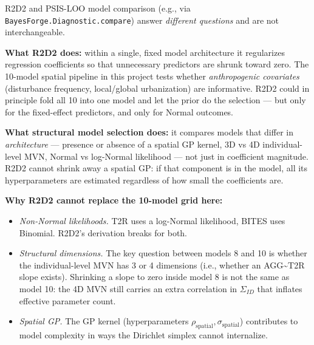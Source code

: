 \documentclass[
  letterpaper,
  DIV=11,
  numbers=noendperiod]{scrartcl}
\providecommand{\tightlist}{%
  \setlength{\itemsep}{0pt}\setlength{\parskip}{0pt}}\usepackage{longtable,booktabs,array}
\begin{document}
\begin{tcolorbox}[enhanced jigsaw, titlerule=0mm, arc=.35mm, leftrule=.75mm, colback=white, bottomtitle=1mm, toptitle=1mm, colbacktitle=quarto-callout-note-color!10!white, colframe=quarto-callout-note-color-frame, opacitybacktitle=0.6, bottomrule=.15mm, opacityback=0, toprule=.15mm, left=2mm, title=\textcolor{quarto-callout-note-color}{\faInfo}\hspace{0.5em}{Note}, rightrule=.15mm, breakable, coltitle=black]

R2D2 and PSIS-LOO model comparison (e.g., via
\texttt{BayesForge.Diagnostic.compare}) answer \emph{different
questions} and are not interchangeable.

\textbf{What R2D2 does:} within a single, fixed model architecture it
regularizes regression coefficients so that unnecessary predictors are
shrunk toward zero. The 10-model spatial pipeline in this project tests
whether \emph{anthropogenic covariates} (disturbance frequency,
local/global urbanization) are informative. R2D2 could in principle fold
all 10 into one model and let the prior do the selection --- but only
for the fixed-effect predictors, and only for Normal outcomes.

\textbf{What structural model selection does:} it compares models that
differ in \emph{architecture} --- presence or absence of a spatial GP
kernel, 3D vs 4D individual-level MVN, Normal vs log-Normal likelihood
--- not just in coefficient magnitude. R2D2 cannot shrink away a spatial
GP: if that component is in the model, all its hyperparameters are
estimated regardless of how small the coefficients are.

\textbf{Why R2D2 cannot replace the 10-model grid here:}

\begin{itemize}
\tightlist
\item
  \emph{Non-Normal likelihoods.} T2R uses a log-Normal likelihood, BITES
  uses Binomial. R2D2's derivation breaks for both.
\item
  \emph{Structural dimensions.} The key question between models 8 and 10
  is whether the individual-level MVN has 3 or 4 dimensions (i.e.,
  whether an AGG\textasciitilde T2R slope exists). Shrinking a slope to
  zero inside model 8 is not the same as model 10: the 4D MVN still
  carries an extra correlation in \(\Sigma_{ID}\) that inflates
  effective parameter count.
\item
  \emph{Spatial GP.} The GP kernel (hyperparameters
  \(\rho_{\text{spatial}}, \sigma_{\text{spatial}}\)) contributes to
  model complexity in ways the Dirichlet simplex cannot internalize.
\end{itemize}


\end{tcolorbox}
\end{document}
